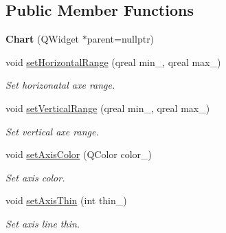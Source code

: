 \subsection*{Public Member Functions}
\begin{DoxyCompactItemize}
\item 
\mbox{\label{classeven_1_1_chart_aa910a655d7f2f6246d937ab904852f69}} 
{\bfseries Chart} (Q\+Widget $\ast$parent=nullptr)
\item 
\mbox{\label{classeven_1_1_chart_a404a0943f4cdb29a9a03e1d0a7ef8d07}} 
void \mbox{\hyperlink{classeven_1_1_chart_a404a0943f4cdb29a9a03e1d0a7ef8d07}{set\+Horizontal\+Range}} (qreal min\+\_\+, qreal max\+\_\+)
\begin{DoxyCompactList}\small\item\em Set horizonatal axe range. \end{DoxyCompactList}\item 
\mbox{\label{classeven_1_1_chart_ae48c4eb00be00c945f68b8f76ae849ba}} 
void \mbox{\hyperlink{classeven_1_1_chart_ae48c4eb00be00c945f68b8f76ae849ba}{set\+Vertical\+Range}} (qreal min\+\_\+, qreal max\+\_\+)
\begin{DoxyCompactList}\small\item\em Set vertical axe range. \end{DoxyCompactList}\item 
\mbox{\label{classeven_1_1_chart_a491f5f5f0dc99ecc96369770c4cb7181}} 
void \mbox{\hyperlink{classeven_1_1_chart_a491f5f5f0dc99ecc96369770c4cb7181}{set\+Axis\+Color}} (Q\+Color color\+\_\+)
\begin{DoxyCompactList}\small\item\em Set axis color. \end{DoxyCompactList}\item 
\mbox{\label{classeven_1_1_chart_ac7e4042bbdb501c7b903f8143c64c040}} 
void \mbox{\hyperlink{classeven_1_1_chart_ac7e4042bbdb501c7b903f8143c64c040}{set\+Axis\+Thin}} (int thin\+\_\+)
\begin{DoxyCompactList}\small\item\em Set axis line thin. \end{DoxyCompactList}\item 
\mbox{\label{classeven_1_1_chart_ae4c222a4d6c6fc39b1ce3a75fb895e71}} 

\end{DoxyCompactItemize}
